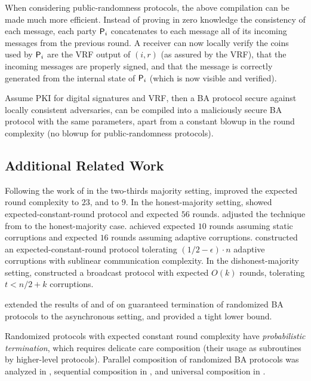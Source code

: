 When considering public-randomness protocols, the above compilation can be made much more efficient. Instead of proving in zero knowledge the consistency of each message, each party $\mathsf{P}_i$ concatenates to each message all of its incoming messages from the previous round. A receiver can now locally verify the coins used by $\mathsf{P}_i$ are the VRF output of $(i,r)$ (as assured by the VRF), that the incoming messages are properly signed, and that the message is correctly generated from the internal state of $\mathsf{P}_i$ (which is now visible and verified).

\begin{theorem}\label{thm:local_to_malicious}
Assume PKI for digital signatures and VRF, then a BA protocol secure against locally consistent adversaries, can be compiled into a maliciously secure BA protocol with the same parameters, apart from a constant blowup in the round complexity (no blowup for public-randomness protocols).
\end{theorem}


\subsection{Additional Related Work}\label{sec:relatedWork}

Following the work of \citet{FM97} in the two-thirds majority setting, \citet{KK06} improved the expected round complexity to $23$, and \citet{Micali17} to $9$. In the honest-majority setting, \citet{FG03} showed expected-constant-round protocol and \citet{KK06} expected $56$ rounds. \citet{MV17} adjusted the technique from \cite{Micali17} to the honest-majority case. \citet{ADDNR19} achieved expected $10$ rounds assuming static corruptions and expected $16$ rounds assuming adaptive corruptions. \citet{ACDNPRS19} constructed an expected-constant-round protocol tolerating $(1/2-\epsilon)\cdot n$ adaptive corruptions with sublinear communication complexity. In the dishonest-majority setting, \citet{GKKO07} constructed a broadcast protocol with expected $O(k)$ rounds, tolerating $t<n/2+k$ corruptions.


\citet{AH10} extended the results of \citet{CMS89} and of \citet{KY86} on guaranteed termination of randomized BA protocols to the asynchronous setting, and provided a tight lower bound.

Randomized protocols with expected constant round complexity have \emph{probabilistic termination}, which requires delicate care \wrt composition (\ie their usage as subroutines by higher-level protocols). Parallel composition of randomized BA protocols was analyzed in \cite{Ben-Or83,FG03}, sequential composition in \cite{LLR06}, and universal composition in \cite{CCGZ16,CCGZ17}.
